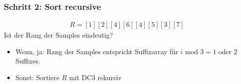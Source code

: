 \documentclass{beamer}
\begin{document}
\begin{frame}
\frametitle{Schritt 2: Sort recursive}
\begin{gather*}
    R = [1][2][4][6][4][5][3][7]
\end{gather*}
Ist der Rang der Samples eindeutig?
\begin{itemize}
    \item Wenn, ja: Rang der Samples entspricht Suffixarray für $i \text{ mod } 3 = 1 \text{ oder } 2$ Suffixes.
    \item Sonst: Sortiere $R$ mit DC3 rekursiv

\end{itemize}
\end{frame}
\end{document}
